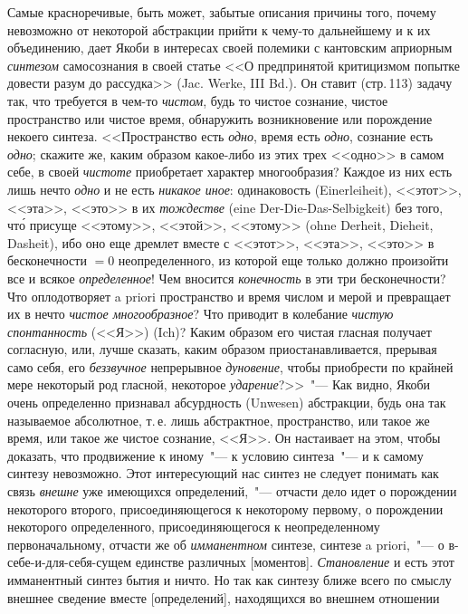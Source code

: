 Самые красноречивые, быть может, забытые описания
причины того, почему невозможно от некоторой абстракции
прийти к чему-то дальнейшему и к их объединению,
дает Якоби в интересах своей полемики с кантовским априорным
\emph{синтезом} самосознания в своей статье <<О предпринятой
критицизмом попытке довести разум до рассудка>>
(Jac. Werke, III Bd.). Он ставит (стр.\,113) задачу
так, что требуется в чем-то \emph{чистом}, будь то чистое сознание,
чистое пространство или чистое время, обнаружить
возникновение или порождение некоего синтеза. <<Пространство
есть \emph{одно}, время есть \emph{одно}, сознание есть \emph{одно};
скажите же, каким образом какое-либо из этих трех
<<одно>> в самом себе, в своей \emph{чистоте} приобретает характер
многообразия? Каждое из них есть лишь нечто \emph{одно}
и не есть \emph{никакое иное}: одинаковость (Einerleiheit),
<<этот>>, <<эта>>, <<это>> в их \emph{тождестве} (eine Der-Die-Das-Selbigkeit)
без того, чт\'о присуще <<этому>>, <<этой>>, <<этому>>
(ohne Derheit, Dieheit, Dasheit), ибо оно еще дремлет
вместе с <<этот>>, <<эта>>, <<это>> в бесконечности $= 0$ неопределенного,
из которой еще только должно произойти
все и всякое \emph{определенное}! Чем вносится \emph{конечность} в
эти три бесконечности? Что оплодотворяет a priori пространство
и время числом и мерой и превращает их в
нечто \emph{чистое многообразное}? Что приводит в колебание
\emph{чистую спонтанность} (<<Я>>) (Ich)? Каким образом его
чистая гласная получает согласную, или, лучше сказать,
каким образом приостанавливается, прерывая само себя,
его \emph{беззвучное} непрерывное \emph{дуновение}, чтобы приобрести
по крайней мере некоторый род гласной, некоторое
\emph{ударение}?>>~"--- Как видно, Якоби очень определенно признавал
абсурдность (Unwesen) абстракции, будь она так
называемое абсолютное, т.\,е. лишь абстрактное, пространство,
или такое же время, или такое же чистое сознание,
<<Я>>. Он настаивает на этом, чтобы доказать, что
продвижение к иному~"--- к условию синтеза~"--- и к самому
синтезу невозможно. Этот интересующий нас синтез не
следует понимать как связь \emph{внешне} уже имеющихся определений,~"---
отчасти дело идет о порождении некоторого
второго, присоединяющегося к некоторому первому, о
порождении некоторого определенного, присоединяющегося
к неопределенному первоначальному, отчасти же об
\emph{имманентном} синтезе, синтезе a priori,~"--- о в-себе-и-для-себя-сущем
единстве различных [моментов]. \emph{Становление}
и есть этот имманентный синтез бытия и ничто. Но так
как синтезу ближе всего по смыслу внешнее сведение
вместе [определений], находящихся во внешнем отношении
